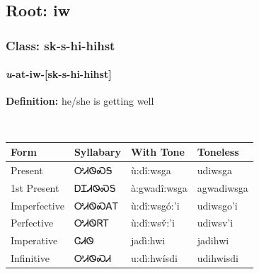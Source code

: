 \needspace{4in}
\subsection*{Root: iw}
\nopagebreak
{}
\needspace{3in}
\subsubsection*{Class: sk-s-hi-hihst}
\nopagebreak
\needspace{2in}
\paragraph*{\textit{u}{-}at{-}\textbf{iw}{-}[sk-s-hi-hihst]}
\nopagebreak
\textbf{Definition: } he/she is getting well
\\[0.5em]
\begin{tabularx}{\textwidth}{l X X X}%
\toprule%
\textbf{Form}&\textbf{Syllabary}&\textbf{With Tone}&\textbf{Toneless}\\%
\midrule%
Present&ᎤᏗᏫᏍᎦ&ù:dî:wsga&udiwsga\\%
1st Present&ᎠᏆᏗᏫᏍᎦ&à:gwadî:wsga&agwadiwsga\\%
Imperfective&ᎤᏗᏫᏍᎪᎢ&ù:dî:wsgó:’i&udiwsgo’i\\%
Perfective&ᎤᏗᏫᏒᎢ&ù:dî:wsv̌:’i&udiwsv’i\\%
Imperative&ᏣᏗᏫ&jadì:hwi&jadihwi\\%
Infinitive&ᎤᏗᏫᏍᏗ&u:dì:hwísdi&udihwisdi\\%
\bottomrule%
\end{tabularx}
\\[1em]